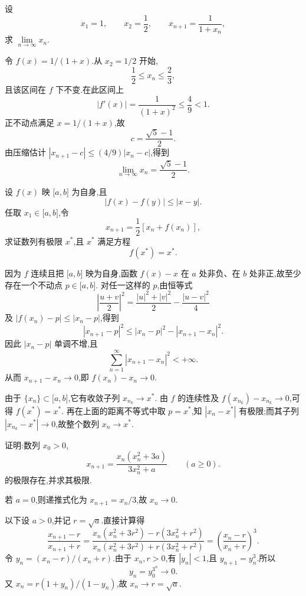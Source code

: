 \begin{example}
  设
  \[
    x_1=1,
    \qquad
    x_2=\dfrac{1}{2},
    \qquad
    x_{n+1}=\dfrac{1}{1+x_n},
  \]
  求 $\displaystyle \lim\limits_{n\to\infty}x_n$.
\end{example}
\exampleblank

\begin{solution}
  令 $f(x)=1/(1+x)$.从 $x_2=1/2$ 开始,
  \[
    \dfrac{1}{2}\leq x_n\leq\dfrac{2}{3},
  \]
  且该区间在 $f$ 下不变.在此区间上
  \[
    |f'(x)|=\dfrac{1}{(1+x)^2}\leq\dfrac{4}{9}<1.
  \]
  正不动点满足 $x=1/(1+x)$,故
  \[
    c=\dfrac{\sqrt5-1}{2}.
  \]
  由压缩估计 $|x_{n+1}-c|\leq(4/9)|x_n-c|$,得到
  \[
    \lim\limits_{n\to\infty}x_n=\dfrac{\sqrt5-1}{2}.
  \]
\end{solution}

\begin{example}
  设 $f(x)$ 映 $\lbrack a,b\rbrack$ 为自身,且
  \[
    |f(x)-f(y)|\leq|x-y|.
  \]
  任取 $x_1\in\lbrack a,b\rbrack$,令
  \[
    x_{n+1}=\dfrac{1}{2}[x_n+f(x_n)],
  \]
  求证数列有极限 $x^*$,且 $x^*$ 满足方程
  \[
    f(x^*)=x^*.
  \]
\end{example}
\exampleblank

\begin{solution}
  因为 $f$ 连续且把 $\lbrack a,b\rbrack$ 映为自身,函数 $f(x)-x$ 在
  $a$ 处非负、在 $b$ 处非正,故至少存在一个不动点 $p\in\lbrack a,b\rbrack$.
  对任一这样的 $p$,由恒等式
  \[
    \left|\dfrac{u+v}{2}\right|^2
    =\dfrac{|u|^2+|v|^2}{2}-\dfrac{|u-v|^2}{4}
  \]
  及 $|f(x_n)-p|\leq|x_n-p|$,得到
  \[
    |x_{n+1}-p|^2
    \leq|x_n-p|^2-|x_{n+1}-x_n|^2.
  \]
  因此 $|x_n-p|$ 单调不增,且
  \[
    \sum\limits_{n=1}^{\infty}|x_{n+1}-x_n|^2<+\infty.
  \]
  从而 $x_{n+1}-x_n\to0$,即 $f(x_n)-x_n\to0$.

  由于 $\{x_n\}\subset\lbrack a,b\rbrack$,它有收敛子列 $x_{n_k}\to x^*$.
  由 $f$ 的连续性及 $f(x_{n_k})-x_{n_k}\to0$,可得 $f(x^*)=x^*$.
  再在上面的距离不等式中取 $p=x^*$,知 $|x_n-x^*|$ 有极限;而其子列
  $|x_{n_k}-x^*|\to0$,故整个数列 $x_n\to x^*$.
\end{solution}

\begin{example}
  证明:数列 $x_0>0$,
  \[
    x_{n+1}=\dfrac{x_n(x_n^2+3a)}{3x_n^2+a}\qquad(a\geq0).
  \]
  的极限存在,并求其极限.
\end{example}
\exampleblank

\begin{solution}
  若 $a=0$,则递推式化为 $x_{n+1}=x_n/3$,故 $x_n\to0$.

  以下设 $a>0$,并记 $r=\sqrt a$.直接计算得
  \[
    \dfrac{x_{n+1}-r}{x_{n+1}+r}
    =\dfrac{x_n(x_n^2+3r^2)-r(3x_n^2+r^2)}
    {x_n(x_n^2+3r^2)+r(3x_n^2+r^2)}
    =\left(\dfrac{x_n-r}{x_n+r}\right)^3.
  \]
  令 $y_n=(x_n-r)/(x_n+r)$.由于 $x_n,r>0$,有 $|y_n|<1$,且
  $y_{n+1}=y_n^3$.所以
  \[
    y_n=y_0^{3^n}\longrightarrow0.
  \]
  又 $x_n=r(1+y_n)/(1-y_n)$,故 $x_n\to r=\sqrt a$.
\end{solution}



